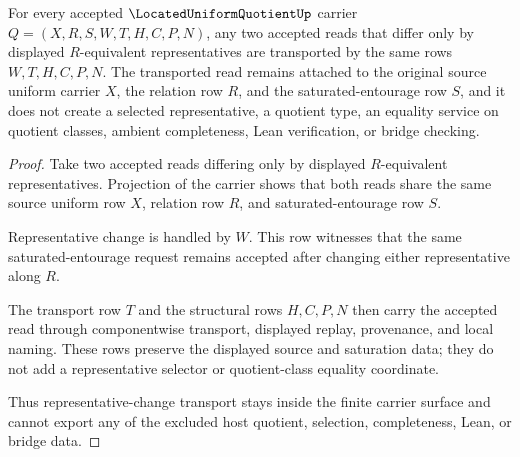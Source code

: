 \begin{theorem}
\label{thm:located-uniform-quotient-representative-change-transport}
For every accepted $\LocatedUniformQuotientUp$ carrier $Q=(X,R,S,W,T,H,C,P,N)$, any two accepted reads that differ only by displayed $R$-equivalent representatives are transported by the same rows $W,T,H,C,P,N$. The transported read remains attached to the original source uniform carrier $X$, the relation row $R$, and the saturated-entourage row $S$, and it does not create a selected representative, a quotient type, an equality service on quotient classes, ambient completeness, Lean verification, or bridge checking.
\end{theorem}
\begin{proof}
Take two accepted reads differing only by displayed $R$-equivalent representatives. Projection of the carrier shows that both reads share the same source uniform row $X$, relation row $R$, and saturated-entourage row $S$.

Representative change is handled by $W$. This row witnesses that the same saturated-entourage request remains accepted after changing either representative along $R$.

The transport row $T$ and the structural rows $H,C,P,N$ then carry the accepted read through componentwise transport, displayed replay, provenance, and local naming. These rows preserve the displayed source and saturation data; they do not add a representative selector or quotient-class equality coordinate.

Thus representative-change transport stays inside the finite carrier surface and cannot export any of the excluded host quotient, selection, completeness, Lean, or bridge data.
\end{proof}



